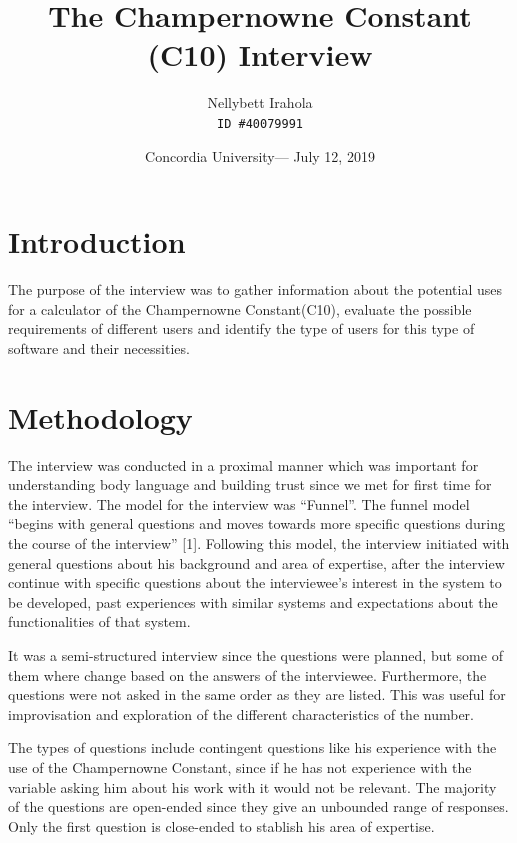 \documentclass{article}
\title{\vspace{-2cm}The Champernowne Constant (C10) Interview} %
\author{Nellybett Irahola\\ \texttt{ID \#40079991}} %
\date{Concordia University--- July 12, 2019} %
\begin{document}
\maketitle %

\section*{Introduction} %

The purpose of the interview was to gather information about the potential uses for a calculator of the Champernowne Constant(C10), evaluate the possible requirements of different users and identify the type of users for this type of software and their necessities.

\section*{Methodology} %

The interview was conducted in a proximal manner which was important for understanding body language and building trust since we met for first time for the interview. The model for the interview was “Funnel”. The funnel model “begins with general questions and moves towards more specific questions during the course of the interview” [1]. Following this model, the interview initiated with general questions about his background and area of expertise, after the interview continue with specific questions about the interviewee’s interest in the system to be developed, past experiences with similar systems and expectations about the functionalities of that system.

It was a semi-structured interview since the questions were planned, but some of them where change based on the answers of the interviewee. Furthermore, the questions were not asked in the same order as they are listed. This was useful for improvisation and exploration of the different characteristics of the number.

The types of questions include contingent questions like his experience with the use of the Champernowne Constant, since if he has not experience with the variable asking him about his work with it would not be relevant. The majority of the questions are open-ended since they give an unbounded range of responses. Only the first question is close-ended to stablish his area of expertise.
\end{document}
